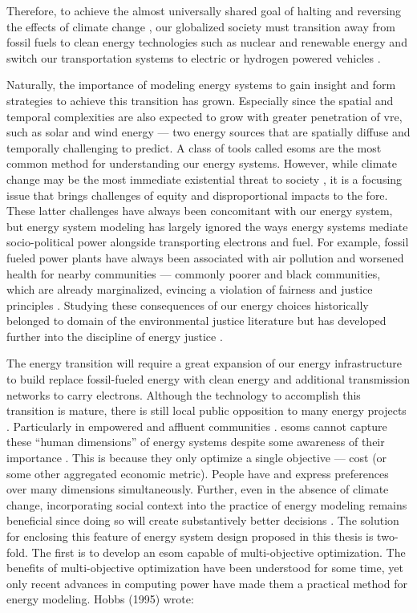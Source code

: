 Therefore, to achieve the almost universally shared goal of halting and
reversing the effects of climate change \cite{united_nations_paris_2015}, our
globalized society must transition away from fossil fuels to clean energy
technologies such as nuclear and renewable energy and switch our transportation
systems to electric or hydrogen powered vehicles
\cite{intergovernmental_panel_on_climate_change_climate_2021}. 

Naturally, the importance of modeling energy systems to gain insight and form
strategies to achieve this transition has grown. Especially since the spatial
and temporal complexities are also expected to grow with greater penetration of
\ac{vre}, such as solar and wind energy --- two energy sources that are
spatially diffuse and temporally challenging to predict. A class of tools called
\acp{esom} are the most common method for understanding our energy systems.
However, while climate change may be the most immediate existential threat to
society \cite{hickman_climate_2021}, it is a focusing issue that brings
challenges of equity and disproportional impacts to the fore. These latter
challenges have always been concomitant with our energy system, but energy
system modeling has largely ignored the ways energy systems mediate
socio-political power alongside transporting electrons and fuel. For example,
fossil fueled power plants have always been associated with air pollution and
worsened health for nearby communities --- commonly poorer and black
communities, which are already marginalized, evincing a violation of fairness
and justice principles \cite{mohai_which_2015}. Studying these consequences of
our energy choices historically belonged to domain of the environmental justice
literature \cite{schlosberg_reconceiving_2004,mohai_environmental_2009} but has
developed further into the discipline of energy justice
\cite{sovacool_energy_2015}. 

The energy transition will require a great expansion of our energy
infrastructure to build replace fossil-fueled energy with clean energy and
additional transmission networks to carry electrons. Although the technology to
accomplish this transition is mature, there is still local public opposition to
many energy projects \cite{wolsink_wind_2007}. Particularly in empowered and
affluent communities \cite{stokes_prevalence_2023}. \acp{esom} cannot capture
these ``human dimensions'' of energy systems despite some awareness of their
importance \cite{pfenninger_energy_2014}. This is because they only optimize a
single objective --- cost (or some other aggregated economic metric). People
have and express preferences over many dimensions simultaneously. Further, even
in the absence of climate change, incorporating social context into the practice
of energy modeling remains beneficial since doing so will create substantively
better decisions \cite{wilsdon_see-through_2004}. The solution for enclosing
this feature of energy system design proposed in this thesis is two-fold. The
first is to develop an \ac{esom} capable of multi-objective optimization. The
benefits of multi-objective optimization have been understood for some time, yet
only recent advances in computing power have made them a practical method for
energy modeling. Hobbs (1995) wrote:


